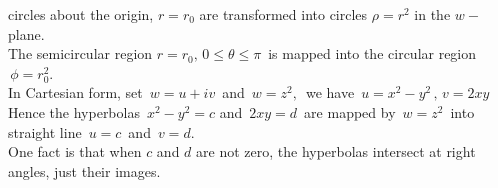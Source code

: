 \documentclass[11pt,a4paper]{article}
\theoremstyle{definition}
\begin{document}
circles about the origin, $r = r_0$ are transformed into circles $\rho = r^2$ in the $w-$plane.\\


The semicircular region $r = r_0, \, 0\leq \theta \leq \pi\,$ is mapped into the circular region $\, \phi = r^2_0$.\\

In Cartesian form, set $\, w = u + iv\,$ and $\, w = z^2,\, $ we have $\, u = x^2 - y^2\, , \, v = 2xy$\\

Hence the hyperbolas $\, x^2 - y^2 = c$ and $\, 2xy = d\,$ are mapped by $\, w = z^2\,$ into straight line $\, u = c \,$ and $\, v = d$.\\

One fact is that when $c$ and $d$ are not zero, the hyperbolas intersect at right angles, just their images.\\\\\\
\end{document}
